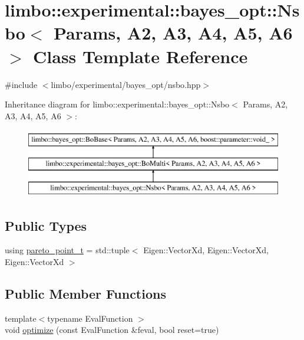 \hypertarget{classlimbo_1_1experimental_1_1bayes__opt_1_1_nsbo}{}\section{limbo\+:\+:experimental\+:\+:bayes\+\_\+opt\+:\+:Nsbo$<$ Params, A2, A3, A4, A5, A6 $>$ Class Template Reference}
\label{classlimbo_1_1experimental_1_1bayes__opt_1_1_nsbo}


{\ttfamily \#include $<$limbo/experimental/bayes\+\_\+opt/nsbo.\+hpp$>$}

Inheritance diagram for limbo\+:\+:experimental\+:\+:bayes\+\_\+opt\+:\+:Nsbo$<$ Params, A2, A3, A4, A5, A6 $>$\+:\begin{figure}[H]
\begin{center}
\leavevmode
\includegraphics[height=3.000000cm]{classlimbo_1_1experimental_1_1bayes__opt_1_1_nsbo}
\end{center}
\end{figure}
\subsection*{Public Types}
\begin{DoxyCompactItemize}
\item 
using \hyperlink{classlimbo_1_1experimental_1_1bayes__opt_1_1_nsbo_a93c82b65f5d97442e1c8299ea1a17f49}{pareto\+\_\+point\+\_\+t} = std\+::tuple$<$ Eigen\+::\+Vector\+Xd, Eigen\+::\+Vector\+Xd, Eigen\+::\+Vector\+Xd $>$
\end{DoxyCompactItemize}
\subsection*{Public Member Functions}
\begin{DoxyCompactItemize}
\item 
{\footnotesize template$<$typename Eval\+Function $>$ }\\void \hyperlink{classlimbo_1_1experimental_1_1bayes__opt_1_1_nsbo_a58cae8a4e4902070ef05e9320604805f}{optimize} (const Eval\+Function \&feval, bool reset=true)
\end{DoxyCompactItemize}


